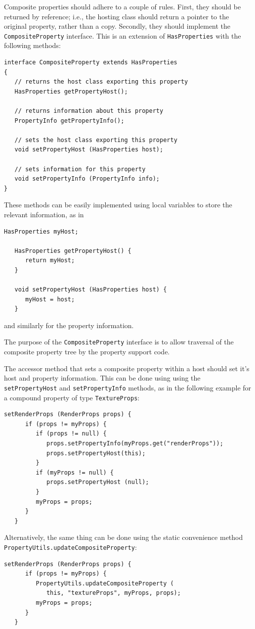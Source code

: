 \documentclass{article}
\begin{document}
Composite properties should adhere to a couple of rules.  First, they
should be returned by reference; i.e., the hosting class should return
a pointer to the original property, rather than a copy.
Secondly, they should implement the {\tt CompositeProperty}
interface.  This is an extension of {\tt HasProperties} with the
following methods:
\begin{lstlisting}[]
interface CompositeProperty extends HasProperties
{   
   // returns the host class exporting this property
   HasProperties getPropertyHost();

   // returns information about this property
   PropertyInfo getPropertyInfo();

   // sets the host class exporting this property
   void setPropertyHost (HasProperties host);

   // sets information for this property
   void setPropertyInfo (PropertyInfo info);
}
\end{lstlisting}
These methods can be easily implemented using local variables to store
the relevant information, as in
\begin{lstlisting}[]
   HasProperties myHost;

   HasProperties getPropertyHost() {
      return myHost;
   }

   void setPropertyHost (HasProperties host) {
      myHost = host;
   }
\end{lstlisting}
and similarly for the property information.

The purpose of the {\tt CompositeProperty} interface is to allow
traversal of the composite property tree by the property support code.

The accessor method that sets a composite property within a host
should set it's host and property information. This can be done using
using the {\tt setPropertyHost} and {\tt setPropertyInfo} methods, as
in the following example for a compound property of type 
{\tt TextureProps}:
\begin{lstlisting}[]
   setRenderProps (RenderProps props) {
      if (props != myProps) {
         if (props != null) {
            props.setPropertyInfo(myProps.get("renderProps")); 
            props.setPropertyHost(this);
         }
         if (myProps != null) {
            props.setPropertyHost (null);
         }
         myProps = props;
      }
   }
\end{lstlisting}
Alternatively, the same thing can be done using the static convenience
method {\tt PropertyUtils.updateCompositeProperty}:
\begin{lstlisting}[]
   setRenderProps (RenderProps props) {
      if (props != myProps) {
         PropertyUtils.updateCompositeProperty (
            this, "textureProps", myProps, props);
         myProps = props;
      }
   }
\end{lstlisting}
\end{document}
